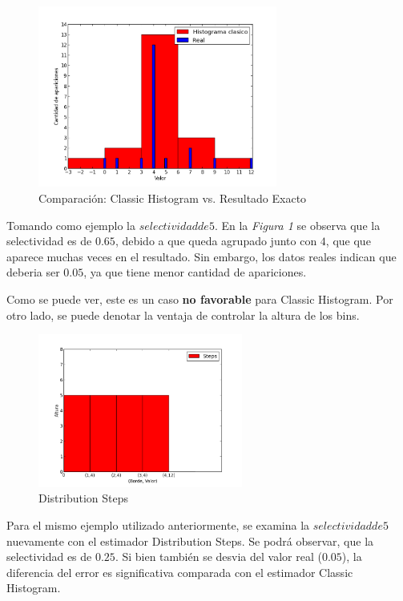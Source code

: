 \documentclass[10pt, a4paper,english,spanish,hidelinks]{article}
\begin{document}
\begin{figure}[h!]
  \centering
  \includegraphics[width=0.7\textwidth]{./imagenes/ejb1_ejemplo_classic_y_real.png}
  \caption{Comparación: Classic Histogram vs. Resultado Exacto}
\end{figure}


Tomando como ejemplo la $selectividad de 5$.
En la \textit{Figura 1} se observa que la selectividad es de $0.65$, debido a que queda agrupado junto
con $4$, que que aparece muchas veces en el resultado. Sin embargo, los datos reales indican que deberia ser $0.05$, ya que tiene menor cantidad de apariciones.

Como se puede ver, este es un caso \textbf{no favorable} para Classic Histogram. Por otro lado, se puede denotar la ventaja de controlar la altura de los bins.

\newpage
\begin{figure}[h!]
  \centering
  \includegraphics[width=0.6\textwidth]{./imagenes/ejb1_ejemplo_steps.png}
  \caption{Distribution Steps}
\end{figure}


Para el mismo ejemplo utilizado anteriormente, se examina la $selectividad de 5$ nuevamente con el estimador Distribution Steps.
Se podrá observar, que la selectividad es de $0.25$. Si bien también se desvia del
valor real ($0.05$), la diferencia del error es significativa comparada con el estimador Classic Histogram.
\end{document}

